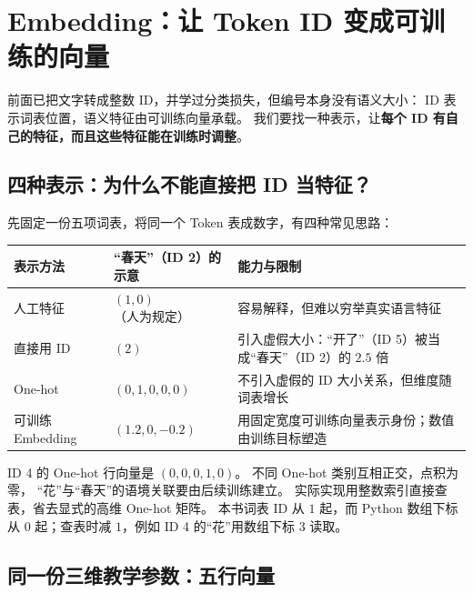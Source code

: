\chapterrule
\section{Embedding：让 Token ID 变成可训练的向量}
\label{intro:embeddings}
\label{concept:embedding}

前面已把文字转成整数 ID，并学过分类损失，但编号本身没有语义大小：
ID 表示词表位置，语义特征由可训练向量承载。
我们要找一种表示，让\textbf{每个 ID 有自己的特征，而且这些特征能在训练时调整}。

\subsection{四种表示：为什么不能直接把 ID 当特征？}
\label{partq:tokens}

先固定一份五项词表，将同一个 Token 表成数字，有四种常见思路：
\begin{center}\small
{}
\begin{tabularx}{\linewidth}{@{}p{25mm}p{34mm}X@{}}
\toprule
表示方法 & “春天”（ID 2）的示意 & 能力与限制\\\midrule
人工特征 & $(1,0)$（人为规定） & 容易解释，但难以穷举真实语言特征\\
直接用 ID & $(2)$ & 引入虚假大小：“开了”（ID 5）被当成“春天”（ID 2）的 $2.5$ 倍\\
One-hot & $(0,1,0,0,0)$ & 不引入虚假的 ID 大小关系，但维度随词表增长\\
可训练 Embedding & $(1.2,0,-0.2)$ & 用固定宽度可训练向量表示身份；数值由训练目标塑造\\
\bottomrule
\end{tabularx}
\end{center}
ID 4 的 One-hot 行向量是 $(0,0,0,1,0)$。
不同 One-hot 类别互相正交，点积为零，
“花”与“春天”的语境关联要由后续训练建立。
实际实现用整数索引直接查表，省去显式的高维 One-hot 矩阵。
本书词表 ID 从 $1$ 起，而 Python 数组下标从 $0$ 起；查表时减 $1$，例如 ID 4 的“花”用数组下标 $3$ 读取。

\subsection{同一份三维教学参数：五行向量}

